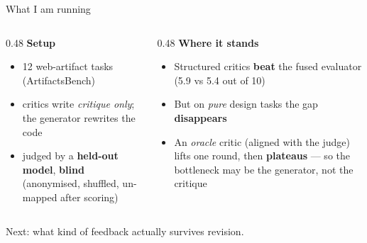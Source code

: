 \documentclass[aspectratio=169,10pt]{beamer}
\newcommand{\hl}[1]{\textbf{\color{navymain}#1}}
\newcommand{\bad}[1]{\textbf{\color{accentred}#1}}
\newcommand{\gd}[1]{\textbf{\color{winner}#1}}
\begin{document}
\begin{frame}{What I am running}
\vspace{0.8em}
\begin{columns}[T,onlytextwidth]
\begin{column}{0.48\textwidth}
\textbf{\color{navymain}Setup}
\begin{itemize}\itemsep0.15em
  \item 12 web-artifact tasks (ArtifactsBench)
  \item critics write \emph{critique only}; the generator rewrites the code
  \item judged by a \hl{held-out model}, \hl{blind}
        {\scriptsize (anonymised, shuffled, un-mapped after scoring)}
\end{itemize}
\end{column}
\begin{column}{0.48\textwidth}
\textbf{\color{navymain}Where it stands}
\begin{itemize}\itemsep0.15em
  \item Structured critics \gd{beat} the fused evaluator
        {\scriptsize (5.9 vs 5.4 out of 10)}
  \item But on \emph{pure} design tasks the gap \bad{disappears}
  \item An \emph{oracle} critic (aligned with the judge) lifts one round,
        then \bad{plateaus} --- so the bottleneck may be the generator, not the critique
\end{itemize}
\end{column}
\end{columns}

\vspace{0.6em}
\centering
{\small\color{gray60} Next: what kind of feedback actually survives revision.}
\end{frame}
\end{document}
